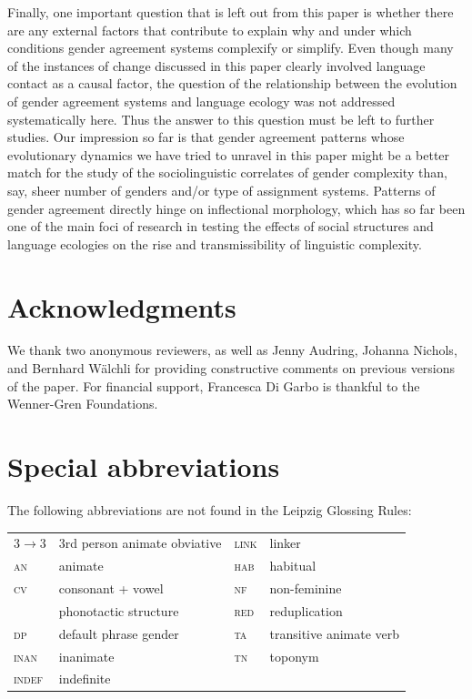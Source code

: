 \documentclass[output=collectionpaper]{langsci/langscibook}
\begin{document}
Finally, one important question that is left out from this paper is whether there are any external factors that contribute to explain why and under which conditions gender agreement systems complexify or simplify. Even though many of the instances of change discussed in this paper clearly involved language contact as a causal factor, the question of the relationship between the evolution of gender agreement systems and language ecology  was not addressed systematically here. Thus the answer to this question must be left to further studies. Our impression so far is that gender agreement patterns \textendash{} whose evolutionary dynamics we have tried to unravel in this paper \textendash{} might be a better match for the study of the sociolinguistic correlates of gender complexity than, say, sheer number of genders and/or type of assignment systems. Patterns of gender agreement directly hinge on inflectional morphology, which has so far been one of the main foci of research in testing the effects of social structures and language ecologies on the rise and transmissibility of linguistic complexity.



\section*{Acknowledgments} 
We thank two anonymous reviewers, as well as Jenny Audring, Johanna Nichols, and Bernhard W\"alchli for providing constructive comments on previous versions of the paper. For financial support, Francesca Di Garbo is thankful to the Wenner-Gren Foundations.

\section*{Special abbreviations}
\noindent The following abbreviations are not found in the Leipzig Glossing Rules:
\medskip

\noindent
\begin{tabular}{llll}
  3$ \rightarrow $3	&	3rd person animate obviative	&  	  \textsc{link}	&	linker	\\
  \textsc{an}	&	animate	& 	 \textsc{hab}	&	habitual	\\
  \textsc{cv} 	&	 consonant + vowel	&	\textsc{nf}	&	non-feminine	\\
	&	 phonotactic structure 	&	\textsc{red}	&	reduplication	\\
  \textsc{dp} 	&	default phrase gender	& \textsc{ta}	&	transitive animate verb	\\
  \textsc{inan}	&	inanimate	&	\textsc{tn}	&	toponym	\\
  \textsc{indef}	&	indefinite	&&\\
\end{tabular}
\end{document}
